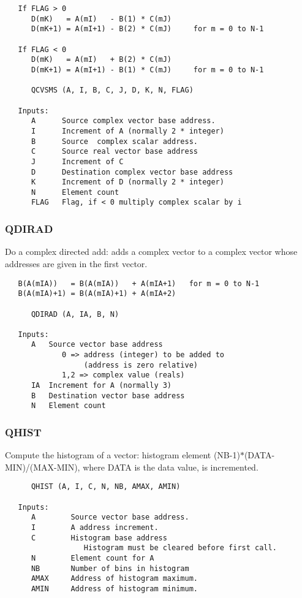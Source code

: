 \begin{verbatim}
   If FLAG > 0
      D(mK)   = A(mI)   - B(1) * C(mJ)
      D(mK+1) = A(mI+1) - B(2) * C(mJ)     for m = 0 to N-1

   If FLAG < 0
      D(mK)   = A(mI)   + B(2) * C(mJ)
      D(mK+1) = A(mI+1) - B(1) * C(mJ)     for m = 0 to N-1

      QCVSMS (A, I, B, C, J, D, K, N, FLAG)

   Inputs:
      A      Source complex vector base address.
      I      Increment of A (normally 2 * integer)
      B      Source  complex scalar address.
      C      Source real vector base address
      J      Increment of C
      D      Destination complex vector base address
      K      Increment of D (normally 2 * integer)
      N      Element count
      FLAG   Flag, if < 0 multiply complex scalar by i

\end{verbatim}
\subsubsection{QDIRAD }
Do a complex directed add: adds a complex vector to a complex vector
whose addresses are given in the first vector.

\begin{verbatim}
   B(A(mIA))   = B(A(mIA))   + A(mIA+1)   for m = 0 to N-1
   B(A(mIA)+1) = B(A(mIA)+1) + A(mIA+2)

      QDIRAD (A, IA, B, N)

   Inputs:
      A   Source vector base address
             0 => address (integer) to be added to
                  (address is zero relative)
             1,2 => complex value (reals)
      IA  Increment for A (normally 3)
      B   Destination vector base address
      N   Element count

\end{verbatim}
\subsubsection{QHIST }
Compute the histogram of a vector: histogram element
(NB-1)$\ast$(DATA-MIN)/(MAX-MIN), where DATA is the data value, is
incremented.

\begin{verbatim}
      QHIST (A, I, C, N, NB, AMAX, AMIN)

   Inputs:
      A        Source vector base address.
      I        A address increment.
      C        Histogram base address
                  Histogram must be cleared before first call.
      N        Element count for A
      NB       Number of bins in histogram
      AMAX     Address of histogram maximum.
      AMIN     Address of histogram minimum.
 
\end{verbatim}
